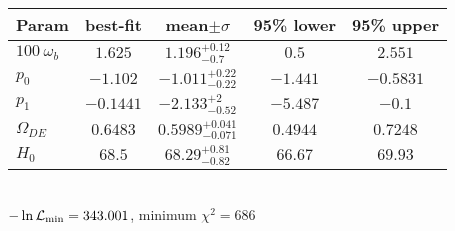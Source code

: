\begin{tabular}{|l|c|c|c|c|} 
 \hline 
Param & best-fit & mean$\pm\sigma$ & 95\% lower & 95\% upper \\ \hline 
$100~\omega_{b }$ &$1.625$ & $1.196_{-0.7}^{+0.12}$ & $0.5$ & $2.551$ \\ 
$p_{0 }$ &$-1.102$ & $-1.011_{-0.22}^{+0.22}$ & $-1.441$ & $-0.5831$ \\ 
$p_{1 }$ &$-0.1441$ & $-2.133_{-0.52}^{+2}$ & $-5.487$ & $-0.1$ \\ 
$\Omega_{DE}$ &$0.6483$ & $0.5989_{-0.071}^{+0.041}$ & $0.4944$ & $0.7248$ \\ 
$H_{0 }$ &$68.5$ & $68.29_{-0.82}^{+0.81}$ & $66.67$ & $69.93$ \\ 
\hline 
 \end{tabular} \\ 
$-\ln{\cal L}_\mathrm{min} =343.001$, minimum $\chi^2=686$ \\ 
